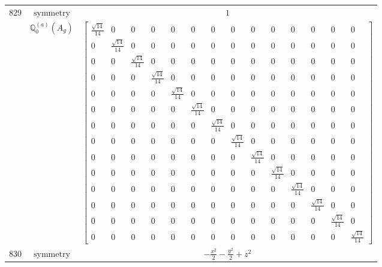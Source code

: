 \documentclass[fleqn,8pt,landscape]{jsarticle}
\begin{document}
\begin{longtable}{ccc}
$ 829 $ & $ \text{symmetry} $ & $ 1 $ \\
$  $ & $ \mathbb{Q}_{0}^{(a)}(A_{g}) $ & $ \begin{bmatrix} \frac{\sqrt{14}}{14} & 0 & 0 & 0 & 0 & 0 & 0 & 0 & 0 & 0 & 0 & 0 & 0 & 0 \\ 0 & \frac{\sqrt{14}}{14} & 0 & 0 & 0 & 0 & 0 & 0 & 0 & 0 & 0 & 0 & 0 & 0 \\ 0 & 0 & \frac{\sqrt{14}}{14} & 0 & 0 & 0 & 0 & 0 & 0 & 0 & 0 & 0 & 0 & 0 \\ 0 & 0 & 0 & \frac{\sqrt{14}}{14} & 0 & 0 & 0 & 0 & 0 & 0 & 0 & 0 & 0 & 0 \\ 0 & 0 & 0 & 0 & \frac{\sqrt{14}}{14} & 0 & 0 & 0 & 0 & 0 & 0 & 0 & 0 & 0 \\ 0 & 0 & 0 & 0 & 0 & \frac{\sqrt{14}}{14} & 0 & 0 & 0 & 0 & 0 & 0 & 0 & 0 \\ 0 & 0 & 0 & 0 & 0 & 0 & \frac{\sqrt{14}}{14} & 0 & 0 & 0 & 0 & 0 & 0 & 0 \\ 0 & 0 & 0 & 0 & 0 & 0 & 0 & \frac{\sqrt{14}}{14} & 0 & 0 & 0 & 0 & 0 & 0 \\ 0 & 0 & 0 & 0 & 0 & 0 & 0 & 0 & \frac{\sqrt{14}}{14} & 0 & 0 & 0 & 0 & 0 \\ 0 & 0 & 0 & 0 & 0 & 0 & 0 & 0 & 0 & \frac{\sqrt{14}}{14} & 0 & 0 & 0 & 0 \\ 0 & 0 & 0 & 0 & 0 & 0 & 0 & 0 & 0 & 0 & \frac{\sqrt{14}}{14} & 0 & 0 & 0 \\ 0 & 0 & 0 & 0 & 0 & 0 & 0 & 0 & 0 & 0 & 0 & \frac{\sqrt{14}}{14} & 0 & 0 \\ 0 & 0 & 0 & 0 & 0 & 0 & 0 & 0 & 0 & 0 & 0 & 0 & \frac{\sqrt{14}}{14} & 0 \\ 0 & 0 & 0 & 0 & 0 & 0 & 0 & 0 & 0 & 0 & 0 & 0 & 0 & \frac{\sqrt{14}}{14} \end{bmatrix} $ \\ \hline
$ 830 $ & $ \text{symmetry} $ & $ - \frac{x^{2}}{2} - \frac{y^{2}}{2} + z^{2} $ \\

\end{longtable}
\end{document}
